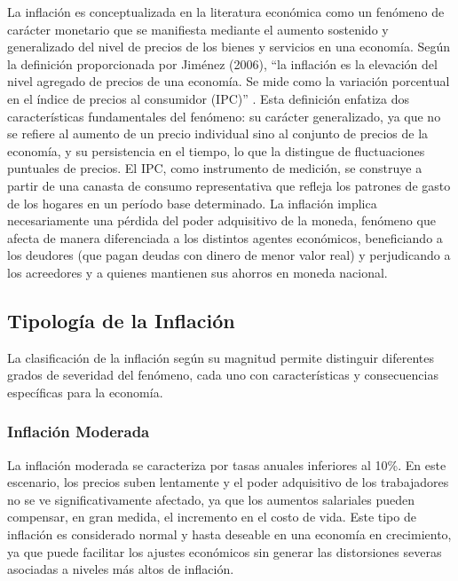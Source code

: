 \documentclass[
  stu,
  floatsintext,
  longtable,
  a4paper,
  nolmodern,
  notxfonts,
  notimes,
  12pt,
  colorlinks=true,linkcolor=blue,citecolor=blue,urlcolor=blue]{apa7}
\begin{document}
La inflación es conceptualizada en la literatura económica como un
fenómeno de carácter monetario que se manifiesta mediante el aumento
sostenido y generalizado del nivel de precios de los bienes y servicios
en una economía. Según la definición proporcionada por Jiménez (2006),
``la inflación es la elevación del nivel agregado de precios de una
economía. Se mide como la variación porcentual en el índice de precios
al consumidor (IPC)'' . Esta definición enfatiza dos características
fundamentales del fenómeno: su carácter generalizado, ya que no se
refiere al aumento de un precio individual sino al conjunto de precios
de la economía, y su persistencia en el tiempo, lo que la distingue de
fluctuaciones puntuales de precios. El IPC, como instrumento de
medición, se construye a partir de una canasta de consumo representativa
que refleja los patrones de gasto de los hogares en un período base
determinado. La inflación implica necesariamente una pérdida del poder
adquisitivo de la moneda, fenómeno que afecta de manera diferenciada a
los distintos agentes económicos, beneficiando a los deudores (que pagan
deudas con dinero de menor valor real) y perjudicando a los acreedores y
a quienes mantienen sus ahorros en moneda nacional.

\subsection{Tipología de la
Inflación}\label{tipologuxeda-de-la-inflaciuxf3n}

La clasificación de la inflación según su magnitud permite distinguir
diferentes grados de severidad del fenómeno, cada uno con
características y consecuencias específicas para la economía.

\subsubsection{Inflación Moderada}\label{inflaciuxf3n-moderada}

La inflación moderada se caracteriza por tasas anuales inferiores al
10\%. En este escenario, los precios suben lentamente y el poder
adquisitivo de los trabajadores no se ve significativamente afectado, ya
que los aumentos salariales pueden compensar, en gran medida, el
incremento en el costo de vida. Este tipo de inflación es considerado
normal y hasta deseable en una economía en crecimiento, ya que puede
facilitar los ajustes económicos sin generar las distorsiones severas
asociadas a niveles más altos de inflación.
\end{document}

